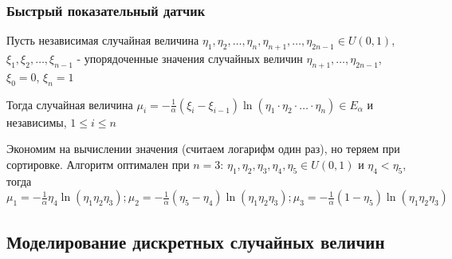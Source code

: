 \documentclass[12pt]{article}
\begin{document}
\subsubsection{Быстрый показательный датчик}

\begin{MyTheorem}
    \Ths Пусть независимая случайная величина $\eta_1, \eta_2, \dots, \eta_n, \eta_{n+1}, \dots, \eta_{2n - 1} \in U(0, 1)$, $\xi_1, \xi_2, \dots, \xi_{n - 1}$ - упорядоченные значения случайных величин $\eta_{n + 1}, \dots, \eta_{2n - 1}$, $\xi_0 = 0$, $\xi_n = 1$

    Тогда случайная величина $\mu_i = -\frac{1}{\alpha}(\xi_i - \xi_{i - 1}) \ln (\eta_1 \cdot \eta_2 \cdot \dots \cdot \eta_n) \in E_\alpha$ и независимы, $1 \leq i \leq n$
\end{MyTheorem}

Экономим на вычислении значения (считаем логарифм один раз), но теряем при сортировке. Алгоритм оптимален при $n = 3$: $\eta_1, \eta_2, \eta_3, \eta_4, \eta_5 \in U(0, 1)$ и $\eta_4 < \eta_5$, тогда $\mu_1 = -\frac{1}{\alpha} \eta_4 \ln (\eta_1 \eta_2 \eta_3); \mu_2 = -\frac{1}{\alpha} (\eta_5 - \eta_4) \ln (\eta_1 \eta_2 \eta_3); \mu_3 = -\frac{1}{\alpha} (1 - \eta_5) \ln (\eta_1 \eta_2 \eta_3)$

\subsection{Моделирование дискретных случайных величин}
\end{document}
